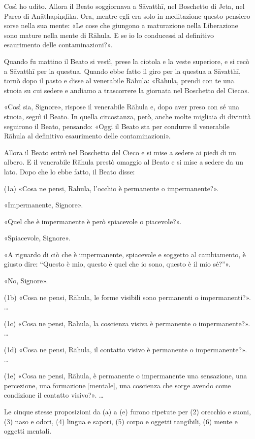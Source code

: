  Così ho udito. Allora il Beato soggiornava a Sāvatthī, nel
Boschetto di Jeta, nel Parco di Anāthapiṇḍika. Ora, mentre egli era solo
in meditazione questo pensiero sorse nella sua mente: «Le cose che
giungono a maturazione nella Liberazione sono mature nella mente di
Rāhula. E se io lo conducessi al definitivo esaurimento delle
contaminazioni?».


Quando fu mattino il Beato si vestì, prese la ciotola e la veste
superiore, e si recò a Sāvatthī per la questua. Quando ebbe fatto il
giro per la questua a Sāvatthī, tornò dopo il pasto e disse al
venerabile Rāhula: «Rāhula, prendi con te una stuoia su cui sedere e
andiamo a trascorrere la giornata nel Boschetto del Cieco».


«Così sia, Signore», rispose il venerabile Rāhula e, dopo aver preso con
sé una stuoia, seguì il Beato. In quella circostanza, però, anche molte
migliaia di divinità seguirono il Beato, pensando: «Oggi il Beato sta
per condurre il venerabile Rāhula al definitivo esaurimento delle
contaminazioni».


Allora il Beato entrò nel Boschetto del Cieco e si mise a sedere ai
piedi di un albero. E il venerabile Rāhula prestò omaggio al Beato e si
mise a sedere da un lato. Dopo che lo ebbe fatto, il Beato disse:


(1a) «Cosa ne pensi, Rāhula, l’occhio è permanente o impermanente?».


«Impermanente, Signore».


«Quel che è impermanente è però spiacevole o piacevole?».


«Spiacevole, Signore».


«A riguardo di ciò che è impermanente, spiacevole e soggetto al
cambiamento, è giusto dire: “Questo è mio, questo è quel che io sono,
questo è il mio sé?”».


«No, Signore».


(1b) «Cosa ne pensi, Rāhula, le forme visibili sono permanenti o
impermanenti?». …


(1c) «Cosa ne pensi, Rāhula, la coscienza visiva è permanente o
impermanente?». …


(1d) «Cosa ne pensi, Rāhula, il contatto visivo è permanente o
impermanente?». …


(1e) «Cosa ne pensi, Rāhula, è permanente o impermanente una sensazione,
una percezione, una formazione [mentale], una coscienza che sorge avendo
come condizione il contatto visivo?». …


 Le cinque stesse proposizioni da (a) a (e) furono
ripetute per (2) orecchio e suoni, (3) naso e odori, (4) lingua e
sapori, (5) corpo e oggetti tangibili, (6) mente e oggetti mentali.


